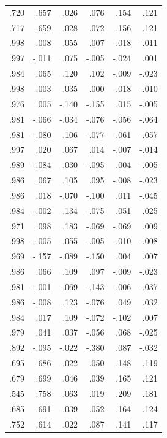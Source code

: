 \documentclass{mcmthesis}
\begin{document}
\begin{appendices}
\begin{table}[htbp]
    \begin{tabular}{|r|r|r|r|r|r|}
    .720  & .657  & .026  & .076  & .154  & .121 \\
    .717  & .659  & .028  & .072  & .156  & .121 \\
    .998  & .008  & .055  & .007  & -.018 & -.011 \\
    .997  & -.011 & .075  & -.005 & -.024 & .001 \\
    .984  & .065  & .120  & .102  & -.009 & -.023 \\
    .998  & .003  & .035  & .000  & -.018 & -.010 \\
    .976  & .005  & -.140 & -.155 & .015  & -.005 \\
    .981  & -.066 & -.034 & -.076 & -.056 & -.064 \\
    .981  & -.080 & .106  & -.077 & -.061 & -.057 \\
    .997  & .020  & .067  & .014  & -.007 & -.014 \\
    .989  & -.084 & -.030 & -.095 & .004  & -.005 \\
    .986  & .067  & .105  & .095  & -.008 & -.023 \\
    .986  & .018  & -.070 & -.100 & .011  & -.045 \\
    .984  & -.002 & .134  & -.075 & .051  & .025 \\
    .971  & .098  & .183  & -.069 & -.069 & .009 \\
    .998  & -.005 & .055  & -.005 & -.010 & -.008 \\
    .969  & -.157 & -.089 & -.150 & .004  & .007 \\
    .986  & .066  & .109  & .097  & -.009 & -.023 \\
    .981  & -.001 & -.069 & -.143 & -.006 & -.037 \\
    .986  & -.008 & .123  & -.076 & .049  & .032 \\
    .984  & .017  & .109  & -.072 & -.102 & .007 \\
    .979  & .041  & .037  & -.056 & .068  & -.025 \\
    .892  & -.095 & -.022 & -.380 & .087  & -.032 \\
    .695  & .686  & .022  & .050  & .148  & .119 \\
    .679  & .699  & .046  & .039  & .165  & .121 \\
    .545  & .758  & .063  & .019  & .209  & .181 \\
    .685  & .691  & .039  & .052  & .164  & .124 \\
    .752  & .614  & .022  & .087  & .141  & .117 \\

\end{tabular}
\end{table}
\end{appendices}
\end{document}

